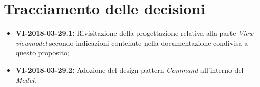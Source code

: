 \documentclass[openany,12pt,a4paper]{article}
\begin{document}
  \section{Tracciamento delle decisioni} 
   
  \begin{itemize} 
      \item \textbf{VI-2018-03-29.1:} Rivisitazione della progettazione relativa alla parte \textit{View-viewmodel} secondo indicazioni contenute nella documentazione condivisa a questo proposito;
      \item \textbf{VI-2018-03-29.2:} Adozione del design pattern \textit{Command} all'interno del \textit{Model}. 
  \end{itemize} 
   
  
\end{document}
